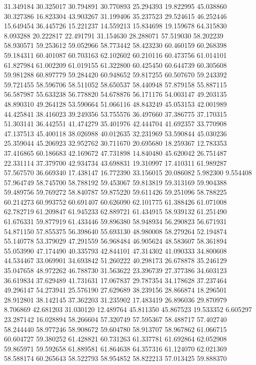 31.349184
30.325017
30.794891
30.770893
25.294393
19.822995
45.038860
30.327386
16.823304
43.903267
31.199406
35.237523
29.524615
46.252446
15.649454
36.445726
15.221237
14.559213
15.834698
19.159678
64.315830
8.093288
20.222817
22.491791
31.154630
28.288071
57.519030
58.202239
58.930571
59.253612
59.052966
58.773442
58.423230
60.460159
60.268398
59.184311
60.401087
60.703163
62.102602
60.210116
60.473756
61.014101
61.827984
61.002209
61.019155
61.322800
60.425450
60.644739
60.305608
59.981288
60.897779
59.284420
60.948652
59.817255
60.507670
59.243392
59.721455
58.596706
58.511052
58.650537
58.440948
57.879158
55.887115
56.587987
55.633238
56.778820
54.678876
56.171176
54.003147
49.203135
48.890310
49.264128
53.590664
51.066116
48.843249
45.053153
42.001989
44.425841
38.416023
39.249356
53.755576
36.497660
37.386775
37.170315
51.303141
36.442551
41.474279
35.401976
42.444704
41.692357
33.770908
47.137513
45.400118
38.026988
40.012635
32.231969
53.590844
45.030236
25.359044
45.206923
32.952762
30.711670
20.695680
18.259367
12.783353
37.416865
60.186683
42.169672
47.731898
14.840480
45.620042
26.751487
22.331114
37.379700
42.934734
43.698831
19.310997
17.410311
61.989287
57.567570
36.669340
17.438147
16.772390
33.156015
20.086082
5.982300
9.554408
57.964749
58.745700
58.788192
59.453067
59.813819
59.313169
59.904388
59.489756
59.769272
58.840787
59.875220
59.611426
59.251096
58.788225
60.214273
60.993752
60.691407
60.626090
62.101775
61.388426
61.071008
62.782719
61.209847
61.945233
62.889721
61.434915
58.939132
61.251490
61.676331
59.877919
61.433446
59.896380
58.948934
56.290823
56.671931
54.871150
57.855375
56.398640
55.693130
48.980008
58.279264
52.194874
55.140778
53.379029
47.291559
56.968484
46.905624
48.583607
58.361894
55.053990
47.174490
40.335793
42.844101
47.314302
41.090333
34.800608
44.534467
33.069901
34.693842
51.260222
40.298173
26.678878
35.246129
35.047658
48.972262
46.788730
31.563622
23.396739
27.377386
34.603123
36.619834
37.629489
41.731631
17.067837
29.787354
34.178628
37.237464
49.296147
54.273941
25.576190
27.629689
38.239156
28.866874
18.296501
28.912801
38.142145
37.362203
31.235902
17.483419
26.896036
29.870979
8.706869
42.681203
31.030120
12.489764
45.811350
45.867523
19.533352
6.605297
23.287142
16.028894
58.266604
57.320749
57.595367
58.488717
57.402740
58.244440
58.977246
58.908672
59.604780
58.913707
58.967862
61.066715
60.604727
59.380252
61.428821
60.731263
61.337781
61.692864
62.052908
59.865971
59.592658
61.889581
61.864638
64.357316
61.124070
62.021369
58.588174
60.265643
58.522793
58.954852
58.822213
57.013425
59.888370
